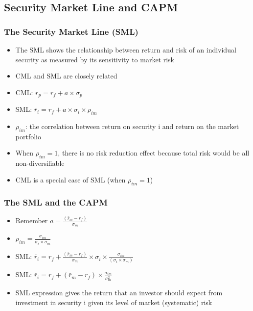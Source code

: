 \documentclass[9pt,aspectratio=169]{beamer}
\begin{document}
\subsection{Security Market Line and CAPM}


\begin{frame}

\frametitle{\textnormal{The Security Market Line (SML)}}

\begin{itemize}
    \item The SML shows the relationship between return and risk of an individual security as measured by its sensitivity to market risk 
\item CML and SML are closely related
\item CML: $\bar{r}_p = r_f + a \times \sigma_p$
\item SML: $\bar{r}_i = r_f + a \times \sigma_i \times \rho_{im}$
\item $\rho_{im}$: the correlation between return on security i and return on the market portfolio
\item When $\rho_{im} = 1$, there is no risk reduction effect because total risk would be all non-diversifiable
\item CML is a special case of SML (when $\rho_{im} = 1$)

\end{itemize}
\end{frame}


\begin{frame}

\frametitle{\textnormal{The SML and the CAPM}}

\begin{itemize}
\item Remember $a = \frac{(\bar{r}_m - r_f)}{\sigma_m}$ 
    
 \item $\rho_{im} = \frac{\sigma_{im}}{\sigma_i \times \sigma_m} $
 
 \item SML: $\bar{r}_i = r_f + \frac{(\bar{r}_m - r_f)}{\sigma_m} \times \sigma_i \times \frac{\sigma_{im}}{(\sigma_i \times \sigma_m)}$
 
 \item SML: $\bar{r}_i = r_f + (\bar{r}_m - r_f) \times \frac{\sigma_{im}}{\sigma_m^2 }$
 
 \item SML expression gives the return that an investor should expect from investment in security i given its level of market (systematic) risk 


\end{itemize}

\end{frame}
\end{document}
